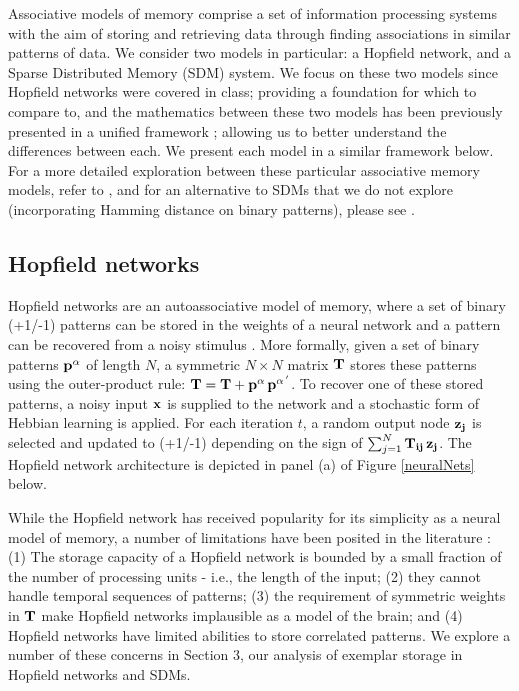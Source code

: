 \documentclass[10pt,letterpaper]{article}
\begin{document}
Associative models of memory comprise a set of information processing systems with the aim of storing and retrieving data through finding associations in similar patterns of data. We consider two models in particular: a Hopfield network, and a Sparse Distributed Memory (SDM) system. We focus on these two models since Hopfield networks were covered in class; providing a foundation for which to compare to, and the mathematics between these two models has been previously presented in a unified framework \cite{Keeler1988}; allowing us to better understand the differences between each.  We present each model in a similar framework below. For a more detailed exploration between these particular associative memory models, refer to , and for an alternative to SDMs that we do not explore (incorporating Hamming distance on binary patterns), please see .

\subsection{Hopfield networks}

Hopfield networks are an autoassociative model of memory, where a set of binary (+1/-1) patterns can be stored in the weights of a neural network and a pattern can be recovered from a noisy stimulus \cite{Hopfield1982}. More formally, given a set of binary patterns $\bf{p}^{\alpha}$ of length $N$, a symmetric $N \times N$ matrix $\bf{T}$ stores these patterns using the outer-product rule: $\bf{T} = \bf{T} + \bf{p}^{\alpha}\,\bf{p}^{\alpha\,'}$. To recover one of these stored patterns, a noisy input $\bf{x}$ is supplied to the network and a stochastic form of Hebbian learning is applied. For each  iteration $t$, a random output node $\bf{z}_{j}$ is selected and updated to (+1/-1) depending on the sign of $\sum_{j=1}^{N} \bf{T}_{ij}\,\bf{z}_{j}$. The Hopfield network architecture is depicted in panel (a) of Figure \ref{neuralNets} below.

While the Hopfield network has received popularity for its simplicity as a neural model of memory, a number of limitations have been posited in the literature \cite{Keeler1988}: (1) The storage capacity of a Hopfield network is bounded by a small fraction of the number of processing units - i.e., the length of the input; (2) they cannot handle temporal sequences of patterns; (3) the requirement of symmetric weights in $\bf{T}$ make Hopfield networks  implausible as a model of the brain; and (4) Hopfield networks have limited abilities to store correlated patterns. We explore a number of these concerns in Section 3, our analysis of exemplar storage in Hopfield networks and SDMs.
\end{document}
